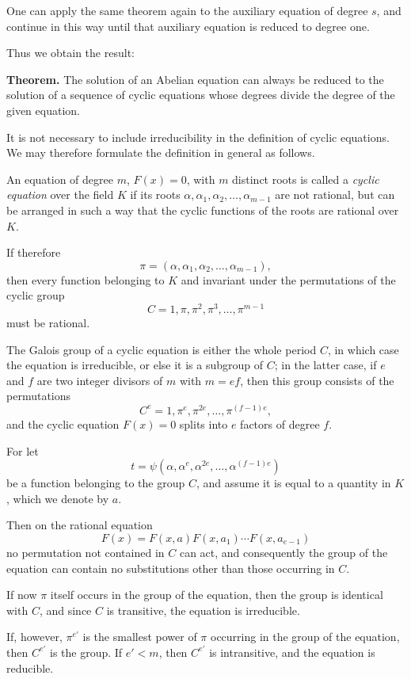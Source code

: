 \documentclass[11pt]{article}
\begin{document}
One can apply the same theorem again to the auxiliary equation of degree $s$, and continue in this way until that auxiliary equation is reduced to degree one.

Thus we obtain the result:

\medskip
\noindent\textbf{Theorem.}
The solution of an Abelian equation can always be reduced to the solution of a sequence of cyclic equations whose degrees divide the degree of the given equation.

\medskip
It is not necessary to include irreducibility in the definition of cyclic equations. We may therefore formulate the definition in general as follows.

An equation of degree $m$, $F(x)=0$, with $m$ distinct roots is called a \emph{cyclic equation} over the field $K$ if its roots $\alpha,\alpha_1,\alpha_2,\dots,\alpha_{m-1}$ are not rational, but can be arranged in such a way that the cyclic functions of the roots are rational over $K$.

If therefore
\[
\pi=(\alpha,\alpha_1,\alpha_2,\dots,\alpha_{m-1}),
\tag{6}
\]
then every function belonging to $K$ and invariant under the permutations of the cyclic group
\[
C=1,\pi,\pi^2,\pi^3,\dots,\pi^{m-1}
\tag{7}
\]
must be rational.

The Galois group of a cyclic equation is either the whole period $C$, in which case the equation is irreducible, or else it is a subgroup of $C$; in the latter case, if $e$ and $f$ are two integer divisors of $m$ with $m=ef$, then this group consists of the permutations
\[
C^e = 1,\pi^e,\pi^{2e},\dots,\pi^{(f-1)e},
\tag{8}
\]
and the cyclic equation $F(x)=0$ splits into $e$ factors of degree $f$.

For let
\[
t=\psi(\alpha,\alpha^e,\alpha^{2e},\dots,\alpha^{(f-1)e})
\]
be a function belonging to the group $C$, and assume it is equal to a quantity in $K$, which we denote by $a$.

Then on the rational equation
\[
F(x)=F(x,a)F(x,a_1)\cdots F(x,a_{e-1})
\]
no permutation not contained in $C$ can act, and consequently the group of the equation can contain no substitutions other than those occurring in $C$.

If now $\pi$ itself occurs in the group of the equation, then the group is identical with $C$, and since $C$ is transitive, the equation is irreducible.

If, however, $\pi^{e'}$ is the smallest power of $\pi$ occurring in the group of the equation, then $C^{e'}$ is the group. If $e'<m$, then $C^{e'}$ is intransitive, and the equation is reducible.
\end{document}
